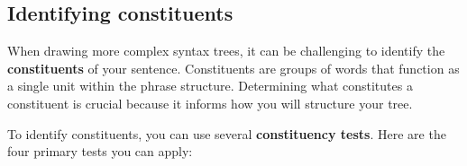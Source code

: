 \ea {}\label{tree:veryhappyaboutit}
\z
{}

\subsection{Identifying constituents}\label{sec:identifying_constituents}

When drawing more complex syntax trees, it can be challenging to identify the \textbf{constituents} of your sentence. Constituents are groups of words that function as a single unit within the phrase structure. Determining what constitutes a constituent is crucial because it informs how you will structure your tree.

To identify constituents, you can use several \textbf{constituency tests}. Here are the four primary tests you can apply:

